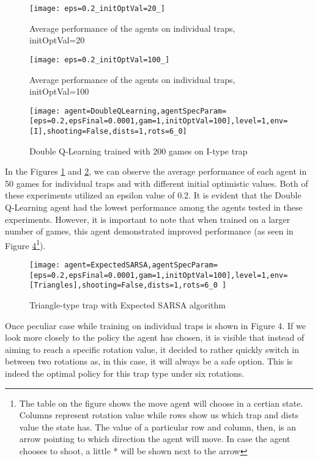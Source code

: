 \begin{figure}[h]
    \centering
    \texttt{[image: eps=0.2\_initOptVal=20\_]}
    \caption{Average performance of the agents on individual traps, initOptVal=20}
    \label{fig:avgiop20}
\end{figure}

\begin{figure}[h]
    \centering
    \texttt{[image: eps=0.2\_initOptVal=100\_]}
    \caption{Average performance of the agents on individual traps, initOptVal=100}
    \label{fig:avgiop100}
\end{figure}

\begin{figure}[h]
    \centering
    \texttt{[image: agent=DoubleQLearning,agentSpecParam=[eps=0.2,epsFinal=0.0001,gam=1,initOptVal=100],level=1,env=[I],shooting=False,dists=1,rots=6\_0]}
    \caption{Double Q-Learning trained with 200 games on I-type trap}
    \label{fig:dqli}
\end{figure}

In the Figures \ref{fig:avgiop20} and \ref{fig:avgiop100}, we can observe the average performance of each agent in 50 games for individual traps and with different initial optimistic values. Both of these experiments utilized an epsilon value of 0.2. It is evident that the Double Q-Learning agent had the lowest performance among the agents tested in these experiments. However, it is important to note that when trained on a larger number of games, this agent demonstrated improved performance (as seen in Figure \ref{fig:dqli}\footnote{The table on the figure shows the move agent will choose in a certian state. Columns represent rotation value while rows show us which trap and dists value the state has. The value of a particular row and column, then, is an arrow pointing to which direction the agent will move. In case the agent chooses to shoot, a little * will be shown next to the arrow}).

\begin{figure}[h]
    \centering
    \texttt{[image: agent=ExpectedSARSA,agentSpecParam=[eps=0.2,epsFinal=0.0001,gam=1,initOptVal=100],level=1,env=[Triangles],shooting=False,dists=1,rots=6\_0
]}
    \caption{Triangle-type trap with Expected SARSA algorithm}
    \label{fig:dqli}
\end{figure}

Once peculiar case while training on individual traps is shown in Figure 4. If we look more closely to the policy the agent has chosen, it is visible that instead of aiming to reach a specific rotation value, it decided to rather quickly switch in between two rotations as, in this case, it will always be a safe option. This is indeed the optimal policy for this trap type under six rotations.

